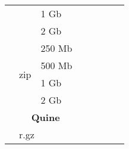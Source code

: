 \documentclass{article}           %
\begin{document}
\begin{table}[]
\begin{tabular}{llllllll}
\multicolumn{1}{|l|}{}                               & \multicolumn{1}{l|}{}                         & \multicolumn{1}{l|}{1 Gb}   & \multicolumn{1}{l|}{}       & \multicolumn{1}{l|}{}       & \multicolumn{1}{l|}{}           & \multicolumn{1}{l|}{}      & \multicolumn{1}{l|}{}        \\ \cline{3-8} 
\multicolumn{1}{|l|}{}                               & \multicolumn{1}{l|}{}                         & \multicolumn{1}{l|}{2 Gb}   & \multicolumn{1}{l|}{}       & \multicolumn{1}{l|}{}       & \multicolumn{1}{l|}{}           & \multicolumn{1}{l|}{}      & \multicolumn{1}{l|}{}        \\ \cline{2-8} 
\multicolumn{1}{|l|}{}                               & \multicolumn{1}{l|}{\multirow{4}{*}{zip}}     & \multicolumn{1}{l|}{250 Mb} & \multicolumn{1}{l|}{}       & \multicolumn{1}{l|}{}       & \multicolumn{1}{l|}{}           & \multicolumn{1}{l|}{}      & \multicolumn{1}{l|}{}        \\ \cline{3-8} 
\multicolumn{1}{|l|}{}                               & \multicolumn{1}{l|}{}                         & \multicolumn{1}{l|}{500 Mb} & \multicolumn{1}{l|}{}       & \multicolumn{1}{l|}{}       & \multicolumn{1}{l|}{}           & \multicolumn{1}{l|}{}      & \multicolumn{1}{l|}{}        \\ \cline{3-8} 
\multicolumn{1}{|l|}{}                               & \multicolumn{1}{l|}{}                         & \multicolumn{1}{l|}{1 Gb}   & \multicolumn{1}{l|}{}       & \multicolumn{1}{l|}{}       & \multicolumn{1}{l|}{}           & \multicolumn{1}{l|}{}      & \multicolumn{1}{l|}{}        \\ \cline{3-8} 
\multicolumn{1}{|l|}{}                               & \multicolumn{1}{l|}{}                         & \multicolumn{1}{l|}{2 Gb}   & \multicolumn{1}{l|}{}       & \multicolumn{1}{l|}{}       & \multicolumn{1}{l|}{}           & \multicolumn{1}{l|}{}      & \multicolumn{1}{l|}{}        \\ \cline{2-8} 
\multicolumn{1}{|l|}{}                               & \multicolumn{2}{c|}{\textbf{Quine}}                                         & \multicolumn{5}{l|}{}                                                                                                                                   \\ \cline{2-8} 
\multicolumn{1}{|l|}{}                               & \multicolumn{2}{l|}{r.gz}                                                   & \multicolumn{1}{l|}{}       & \multicolumn{1}{l|}{}       & \multicolumn{1}{l|}{}           & \multicolumn{1}{l|}{}      & \multicolumn{1}{l|}{}        \\ \cline{2-8} 

\end{tabular}
\end{table}
\end{document}
